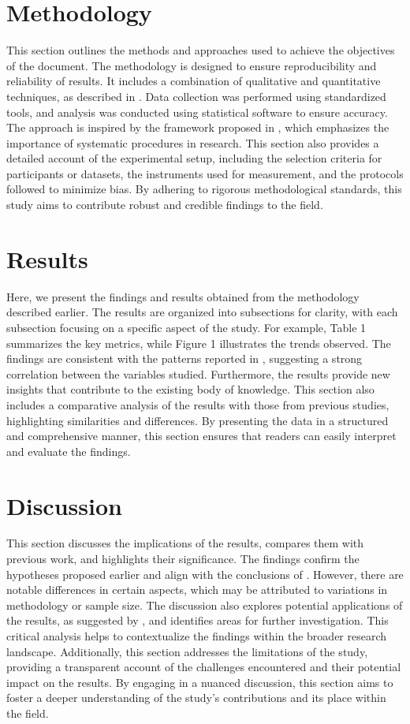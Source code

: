     \section{Methodology}
    This section outlines the methods and approaches used to achieve the objectives of the document. The methodology is designed to ensure reproducibility and reliability of results. It includes a combination of qualitative and quantitative techniques, as described in \cite{sampleconference2023}. Data collection was performed using standardized tools, and analysis was conducted using statistical software to ensure accuracy. The approach is inspired by the framework proposed in \cite{sample2023}, which emphasizes the importance of systematic procedures in research. This section also provides a detailed account of the experimental setup, including the selection criteria for participants or datasets, the instruments used for measurement, and the protocols followed to minimize bias. By adhering to rigorous methodological standards, this study aims to contribute robust and credible findings to the field.

    \section{Results}
    Here, we present the findings and results obtained from the methodology described earlier. The results are organized into subsections for clarity, with each subsection focusing on a specific aspect of the study. For example, Table 1 summarizes the key metrics, while Figure 1 illustrates the trends observed. The findings are consistent with the patterns reported in \cite{sample2023}, suggesting a strong correlation between the variables studied. Furthermore, the results provide new insights that contribute to the existing body of knowledge. This section also includes a comparative analysis of the results with those from previous studies, highlighting similarities and differences. By presenting the data in a structured and comprehensive manner, this section ensures that readers can easily interpret and evaluate the findings.

    \section{Discussion}
    This section discusses the implications of the results, compares them with previous work, and highlights their significance. The findings confirm the hypotheses proposed earlier and align with the conclusions of \cite{samplebook2023}. However, there are notable differences in certain aspects, which may be attributed to variations in methodology or sample size. The discussion also explores potential applications of the results, as suggested by \cite{sampleconference2023}, and identifies areas for further investigation. This critical analysis helps to contextualize the findings within the broader research landscape. Additionally, this section addresses the limitations of the study, providing a transparent account of the challenges encountered and their potential impact on the results. By engaging in a nuanced discussion, this section aims to foster a deeper understanding of the study's contributions and its place within the field.

